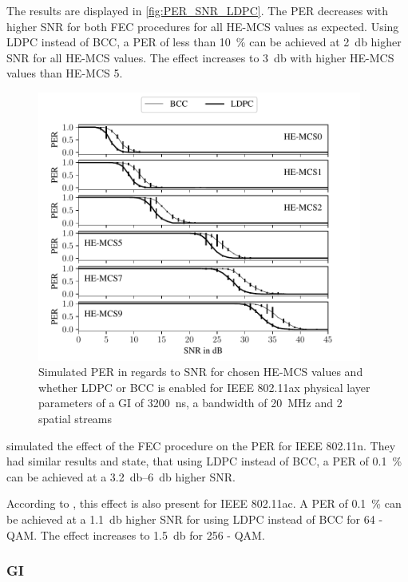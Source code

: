 The results are displayed in \autoref{fig:PER_SNR_LDPC}. The \ac{PER} decreases with higher \ac{SNR} for both \ac{FEC} procedures for all HE-MCS values as
expected. Using \ac{LDPC} instead of \ac{BCC}, a \ac{PER} of less than \SI{10}{\percent} can be achieved at \SI{2}{\decibel} higher \ac{SNR}
for all HE-MCS values. The effect increases to \SI{3}{\decibel} with higher HE-MCS values than HE-MCS \num{5}.
\begin{figure}[H]%
	\centering
	\includegraphics[width=0.95\textwidth]{figures/LDPC_PER_to_SNR.pdf}
	\caption{Simulated \ac{PER} in regards to \ac{SNR} for chosen HE-\ac{MCS} values and whether \ac{LDPC} or \ac{BCC} is enabled for IEEE 802.11ax physical layer parameters of a \ac{GI} of \SI{3200}{\nano\second}, a bandwidth of \SI{20}{\mega\hertz} and 2 spatial streams}%
	\label{fig:PER_SNR_LDPC}%
\end{figure}

\textcite{syafei_performance_2009} simulated the effect of the \ac{FEC} procedure on the \ac{PER} for IEEE 802.11n. They
had similar results and state, that using \ac{LDPC} instead of \ac{BCC}, a \ac{PER} of \SI{0.1}{\percent}  can be achieved at a
\SIrange{3.2}{6}{\decibel} higher \ac{SNR}.

According to \textcite{tran_asic_2014}, this effect is also present for IEEE 802.11ac. A \ac{PER} of \SI{0.1}{\percent} can be achieved at a
\SI{1.1}{\decibel} higher \ac{SNR} for using \ac{LDPC} instead of \ac{BCC} for 64 - \ac{QAM}. The effect increases to \SI{1.5}{\decibel} for 256 - \ac{QAM}.

\subsubsection*{\acf{GI}}

